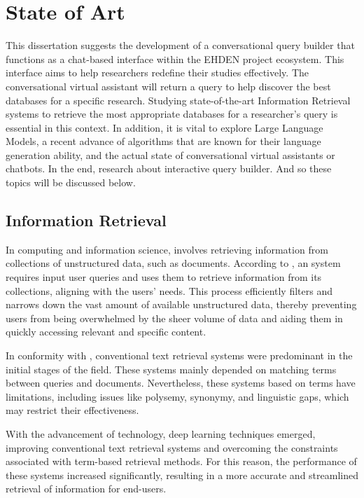 \chapter{State of Art}
\label{chapter: State of Art}

This dissertation suggests the development of a conversational query builder that functions as a chat-based interface within the EHDEN project ecosystem. This interface aims to help researchers redefine their studies effectively. The conversational virtual assistant will return a query to help discover the best databases for a specific research. Studying state-of-the-art Information Retrieval systems to retrieve the most appropriate databases for a researcher's query is essential in this context. In addition, it is vital to explore Large Language Models, a recent advance of algorithms that are known for their language generation ability, and the actual state of conversational virtual assistants or chatbots. In the end, research about interactive query builder. And so these topics will be discussed below.


\section{Information Retrieval}

In computing and information science, {\ir} involves retrieving information from collections of unstructured data, such as documents. According to \citet{p_m_efficient_2021}, an {\ir} system requires input user queries and uses them to retrieve information from its collections, aligning with the users' needs. This process efficiently filters and narrows down the vast amount of available unstructured data, thereby preventing users from being overwhelmed by the sheer volume of data and aiding them in quickly accessing relevant and specific content.

In conformity with \citet{hambarde_information_2023}, conventional text retrieval systems were predominant in the initial stages of the {\ir} field. These systems mainly depended on matching terms between queries and documents. Nevertheless, these systems based on terms have limitations, including issues like polysemy, synonymy, and linguistic gaps, which may restrict their effectiveness.

With the advancement of technology, deep learning techniques emerged, improving conventional text retrieval systems and overcoming the constraints associated with term-based retrieval methods. For this reason, the performance of these systems increased significantly, resulting in a more accurate and streamlined retrieval of information for end-users.

